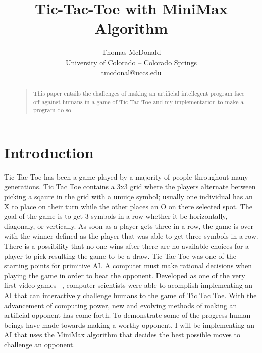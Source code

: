 \documentclass[letterpaper]{article}
\begin{document}
%
\title{Tic-Tac-Toe with MiniMax Algorithm}
\author{ Thomas McDonald\\
University of Colorado – Colorado Springs\\
tmcdonal@uccs.edu\\
}
\maketitle
\begin{abstract}
\begin{quote}
This paper entails the challenges of making an artificial intellegent program face off against humans in a game of Tic Tac Toe and my implementation to make a program do so.  
\end{quote}
\end{abstract}

\section{Introduction}
Tic Tac Toe has been a game played by a majority of people throughout many generations. Tic Tac Toe contains a 3x3 grid where the players alternate between picking a sqaure in the grid with a unuiqe symbol; usually one individual has an X to place on their turn while the other places an O on there selected spot. The goal of the game is to get 3 symbols in a row whether it be horizontally, diagonaly, or vertically. As soon as a player gets three in a row, the game is over with the winner defined as the player that was able to get three symbols in a row. There is a possibility that no one wins after there are no available choices for a player to pick resulting the game to be a draw. Tic Tac Toe was one of the starting points for primitive AI. A computer must make rational decisions when playing the game in order to beat the opponent. Developed as one of the very first video games ~\cite {wikes}, computer scientists were able to acomplish implementing an AI that can interactively challenge humans to the game of Tic Tac Toe. With the advancement of computing power, new and evolving methods of making an artificial opponent has come forth. To demonstrate some of the progress human beings have made towards making a worthy opponent, I will be implementing an AI that uses the MiniMax algorithm that decides the best possible moves to challenge an opponent. 
\end{document}
